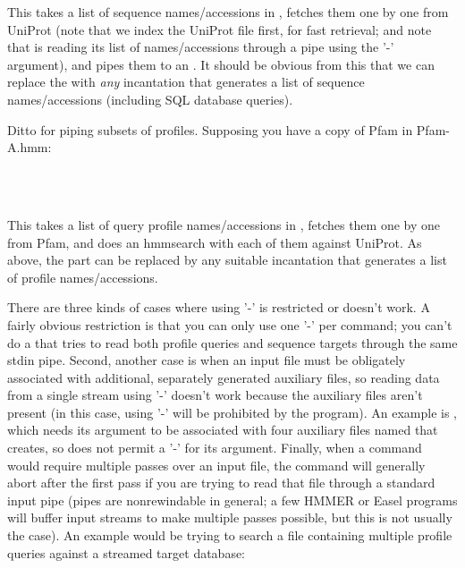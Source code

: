 This takes a list of sequence names/accessions in
, fetches them one by one from UniProt (note that
we index the UniProt file first, for fast retrieval; and note that
 is reading its  list of
names/accessions through a pipe using the '-' argument), and pipes
them to an . It should be obvious from this that we
can replace the  with \emph{any} incantation
that generates a list of sequence names/accessions (including SQL
database queries).

Ditto for piping subsets of profiles. Supposing you have a copy of Pfam in Pfam-A.hmm:

   \vspace{1ex}
   \begin{fullwidth}
    \\
   \\
   \end{fullwidth}
   \vspace{1ex}

This takes a list of query profile names/accessions in
, fetches them one by one from Pfam, and does an
hmmsearch with each of them against UniProt. As above, the  part can be replaced by any suitable incantation
that generates a list of profile names/accessions.

There are three kinds of cases where using '-' is restricted or
doesn't work. A fairly obvious restriction is that you can only use
one '-' per command; you can't do a  that tries to
read both profile queries and sequence targets through the same stdin
pipe. Second, another case is when an input file must be obligately
associated with additional, separately generated auxiliary files, so
reading data from a single stream using '-' doesn't work because the
auxiliary files aren't present (in this case, using '-' will be
prohibited by the program). An example is , which needs
its  argument to be associated with four auxiliary
files named  that  creates,
so  does not permit a '-' for its 
argument. Finally, when a command would require multiple passes over
an input file, the command will generally abort after the first pass
if you are trying to read that file through a standard input pipe
(pipes are nonrewindable in general; a few HMMER or Easel programs
will buffer input streams to make multiple passes possible, but this
is not usually the case). An example would be trying to search a file
containing multiple profile queries against a streamed target
database:

